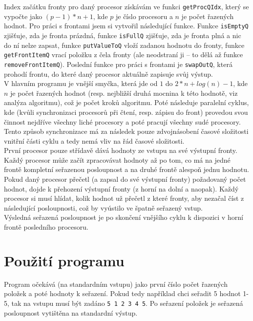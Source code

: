 \documentclass[11pt,a4paper]{article}
\begin{document}
\noindent
Index začátku fronty pro daný procesor získávám ve funkci \texttt{getProcQIdx},
který se vypočte jako $(p - 1) * n + 1$, kde $p$ je číslo procesoru a $n$ je
počet řazených hodnot. Pro práci s frontami jsem si vytvořil následující funkce.
Funkce \texttt{isEmptyQ} zjišťuje, zda je fronta prázdná, funkce \texttt{isFullQ}
zjišťuje, zda je fronta plná a nic do ní nelze zapsat, funkce \texttt{putValueToQ}
vloží zadanou hodnotu do fronty, funkce \texttt{getFrontItemQ} vrací
položku z čela fronty (ale neodstraní ji -- to dělá až funkce \texttt{removeFrontItemQ}).
Poslední funkce pro práci s frontami je \texttt{swapOutQ}, která prohodí frontu,
do které daný procesor aktuálně zapisuje svůj výstup. \\

\noindent
V hlavním programu je vnější smyčka, která jde od $1$ do $2*n + log(n) - 1$,
kde $n$ je počet řazených hodnot (resp. nejbližší druhá mocnina k této hodnotě,
viz analýza algoritmu), což je počet kroků algoritmu. Poté následuje
paralelní cyklus, kde (kvůli synchronizaci procesorů při čtení, resp. zápisu do front)
provedou svou činnost nejdříve všechny liché procesory a poté pracují všechny sudé procesory.
Tento způsob synchronizace má za následek pouze zdvojnásobení časové složitosti
vnitřní části cyklu a tedy nemá vliv na řád časové složitosti. \\

\noindent
První procesor pouze střídavě dává hodnoty ze vstupu na své výstupní fronty.
Každý procesor může začít zpracovávat hodnoty až po tom, co má na jedné frontě
kompletní seřazenou posloupnost a na druhé frontě alespoň jednu hodnotu.
Pokud daný procesor přečetl (a zapsal do své výstupní fronty) požadovaný počet
hodnot, dojde k přehození výstupní fronty (z horní na dolní a naopak).
Každý procesor si musí hlídat, kolik hodnot už přečetl z které fronty, aby nezačal
číst z následující posloupnosti, což by vyústilo ve špatně seřazený vstup. \\

\noindent
Výsledná seřazená posloupnost je po skončení vnějšího cyklu k dispozici v horní
frontě posledního procesoru.

\section{Použití programu}

Program očekává (na standardním vstupu) jako první číslo počet řazených položek
a poté hodnoty k seřazení.
Pokud tedy například chci seřadit 5 hodnot 1-5, tak na vstupu musí být zadáno
\texttt{5 1 2 3 4 5}. Po seřazení položek je seřazená posloupnost vytištěna na
standardní výstup.
\end{document}
